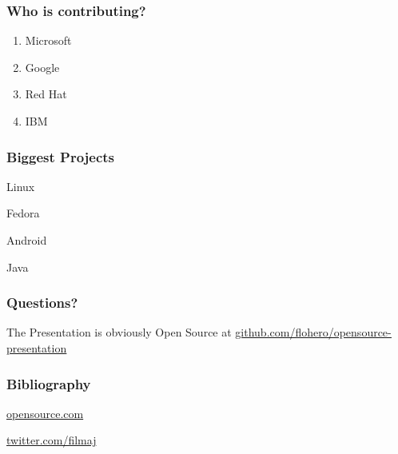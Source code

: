 \documentclass{beamer}
\begin{document}
\begin{frame}
  \frametitle{Who is contributing?}
  \begin{enumerate}
  \item Microsoft
  \item Google
  \item Red Hat
  \item IBM
  \end{enumerate}
\end{frame}


\begin{frame}
  \frametitle{Biggest Projects}
  Linux

  Fedora

  Android

  Java
\end{frame}


\begin{frame}
  \frametitle{Questions?}
  \begin{center}
    The Presentation is obviously Open Source at
    \underline{\href{https://github.com/flohero/opensource-presentation}{github.com/flohero/opensource-presentation}}
    \end{center}
\end{frame}

\begin{frame}
  \frametitle{Bibliography}
  \begin{center}
    \Large
    \href{https://opensource.com/open-source-way}{opensource.com}
    
    \href{https://twitter.com/filmaj}{twitter.com/filmaj}
    
  \end{center}
\end{frame}
\end{document}
